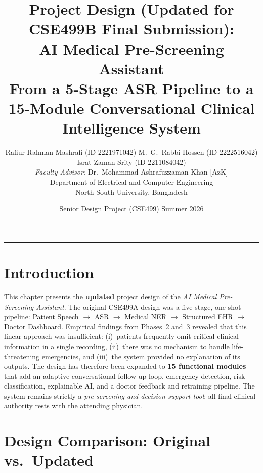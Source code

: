 \documentclass[11pt,a4paper]{article}
\title{\vspace{-20pt}%
  \bfseries Project Design (Updated for CSE499B Final Submission):\\[4pt]
  AI Medical Pre-Screening Assistant\\[3pt]
  \normalfont\normalsize
  From a 5-Stage ASR Pipeline to a 15-Module Conversational Clinical
  Intelligence System}
\author{%
  Rafiur Rahman Mashrafi (ID 2221971042)\quad
  M.~G.~Rabbi Hossen (ID 2222516042)\quad
  Israt Zaman Srity (ID 2211084042)\\[5pt]
  \emph{Faculty Advisor:} Dr.~Mohammad Ashrafuzzaman Khan [AzK]\\
  Department of Electrical and Computer Engineering\\
  North South University, Bangladesh}
\date{Senior Design Project (CSE499) \quad Summer 2026}
\begin{document}
\maketitle
\vspace{-8pt}\rule{\linewidth}{0.7pt}

\section{Introduction}

This chapter presents the \textbf{updated} project design of the
\textit{AI Medical Pre-Screening Assistant}.  The original CSE499A
design was a five-stage, one-shot pipeline: Patient Speech $\to$ ASR
$\to$ Medical NER $\to$ Structured EHR $\to$ Doctor Dashboard.
Empirical findings from Phases~2 and~3 revealed that this linear
approach was insufficient: (i)~patients frequently omit critical
clinical information in a single recording, (ii)~there was no mechanism
to handle life-threatening emergencies, and (iii)~the system provided
no explanation of its outputs. The design has therefore been expanded
to \textbf{15 functional modules} that add an adaptive conversational
follow-up loop, emergency detection, risk classification, explainable
AI, and a doctor feedback and retraining pipeline. The system
remains strictly a \textit{pre-screening and decision-support tool};
all final clinical authority rests with the attending physician.

\section{Design Comparison: Original vs.\ Updated}
\end{document}
